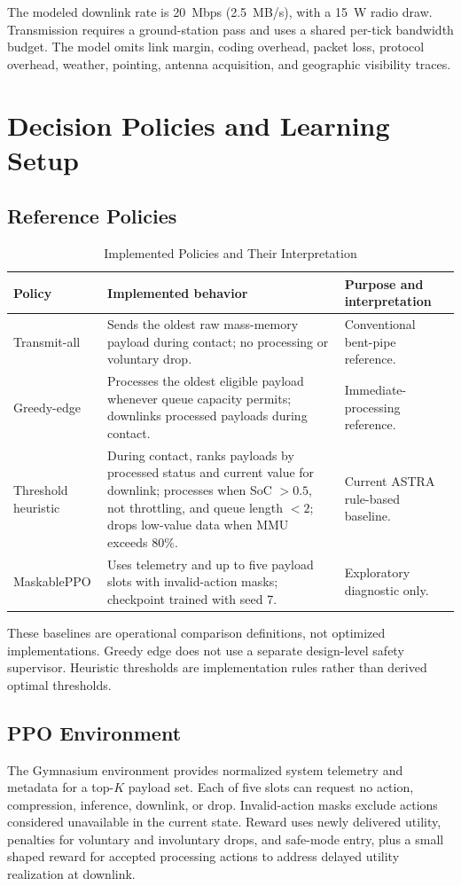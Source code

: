 \documentclass[11pt,letterpaper]{article}
\begin{document}
The modeled downlink rate is 20~Mbps (2.5~MB/s), with a 15~W radio draw. Transmission requires a ground-station pass and uses a shared per-tick bandwidth budget. The model omits link margin, coding overhead, packet loss, protocol overhead, weather, pointing, antenna acquisition, and geographic visibility traces.

\section{Decision Policies and Learning Setup}
\subsection{Reference Policies}
\begin{table}[t]
\caption{Implemented Policies and Their Interpretation}
\label{tab:policies}
\centering
\small
\begin{tabular}{p{}p{}p{}}
\toprule
\textbf{Policy} & \textbf{Implemented behavior} & \textbf{Purpose and interpretation}\\
\midrule
Transmit-all & Sends the oldest raw mass-memory payload during contact; no processing or voluntary drop. & Conventional bent-pipe reference.\\
Greedy-edge & Processes the oldest eligible payload whenever queue capacity permits; downlinks processed payloads during contact. & Immediate-processing reference.\\
Threshold heuristic & During contact, ranks payloads by processed status and current value for downlink; processes when SoC $>0.5$, not throttling, and queue length $<2$; drops low-value data when MMU exceeds 80\%. & Current ASTRA rule-based baseline.\\
MaskablePPO & Uses telemetry and up to five payload slots with invalid-action masks; checkpoint trained with seed 7. & Exploratory diagnostic only.\\
\bottomrule
\end{tabular}
\end{table}

These baselines are operational comparison definitions, not optimized implementations. Greedy edge does not use a separate design-level safety supervisor. Heuristic thresholds are implementation rules rather than derived optimal thresholds.

\subsection{PPO Environment}
The Gymnasium environment provides normalized system telemetry and metadata for a top-$K$ payload set. Each of five slots can request no action, compression, inference, downlink, or drop. Invalid-action masks exclude actions considered unavailable in the current state. Reward uses newly delivered utility, penalties for voluntary and involuntary drops, and safe-mode entry, plus a small shaped reward for accepted processing actions to address delayed utility realization at downlink.
\end{document}
